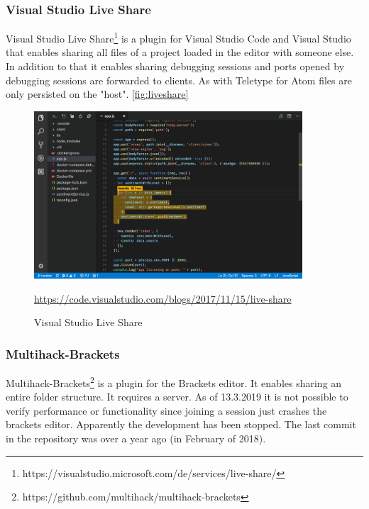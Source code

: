\subsubsection{Visual Studio Live Share}
Visual Studio Live Share\footnote{https://visualstudio.microsoft.com/de/services/live-share/}  is a plugin for Visual Studio Code and Visual Studio that enables sharing all files of a project loaded in the editor with someone else. In addition to that it enables sharing debugging sessions and ports opened by debugging sessions are forwarded to clients. As with Teletype for Atom files are only persisted on the "host". \autoref{fig:liveshare}
\begin{figure}[hb]
    \centering
    \includegraphics[width=100mm]{figures/screenshots/vscodeliveshare.png}
	\caption{Visual Studio Live Share}
	\href{https://code.visualstudio.com/blogs/2017/11/15/live-share}{https://code.visualstudio.com/blogs/2017/11/15/live-share}
    \label{fig:liveshare}
\end{figure}
\subsubsection{Multihack-Brackets}
Multihack-Brackets\footnote{https://github.com/multihack/multihack-brackets} is a plugin for the Brackets editor. It enables sharing an entire folder structure. It requires a server. As of 13.3.2019 it is not possible to verify performance or functionality since joining a session just crashes the brackets editor. Apparently the development has been stopped. The last commit in the repository was over a year ago (in February of 2018).

